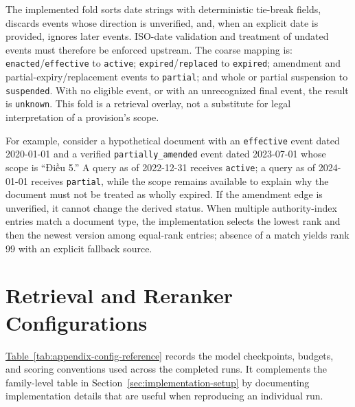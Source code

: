 The implemented fold sorts date strings with deterministic tie-break fields,
discards events whose direction is unverified, and, when an explicit date is
provided, ignores later events. ISO-date validation and treatment of undated
events must therefore be enforced upstream. The coarse mapping is:
\texttt{enacted}/\texttt{effective}
to \texttt{active}; \texttt{expired}/\texttt{replaced} to \texttt{expired};
amendment and partial-expiry/replacement events to \texttt{partial}; and whole
or partial suspension to \texttt{suspended}. With no eligible event, or with
an unrecognized final event, the result is \texttt{unknown}. This fold is a
retrieval overlay, not a substitute for legal interpretation of a provision's
scope.

For example, consider a hypothetical document with an \texttt{effective}
event dated 2020-01-01 and a verified \texttt{partially\_amended} event dated
2023-07-01 whose scope is ``Điều 5.'' A query as of 2022-12-31 receives
\texttt{active}; a query as of 2024-01-01 receives \texttt{partial}, while the
scope remains available to explain why the document must not be treated as
wholly expired. If the amendment edge is unverified, it cannot change the
derived status. When multiple authority-index entries match a document type,
the implementation selects the lowest rank and then the newest version among
equal-rank entries; absence of a match yields rank 99 with an explicit fallback
source.

\section{Retrieval and Reranker Configurations}
\label{app:retrieval-reranker-configurations}

\hyperref[tab:appendix-config-reference]{Table~\ref*{tab:appendix-config-reference}}
records the model checkpoints, budgets, and scoring conventions used across
the completed runs. It complements the family-level table in
Section~\ref{sec:implementation-setup} by documenting implementation details
that are useful when reproducing an individual run.

